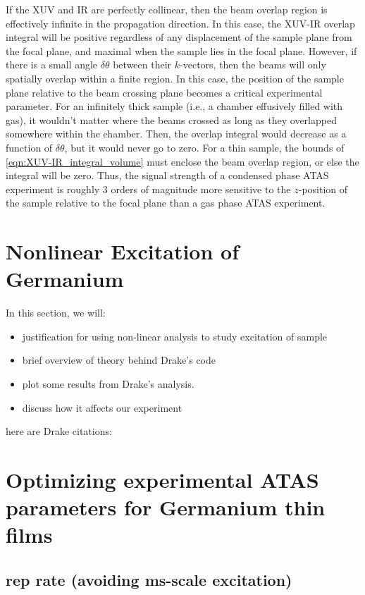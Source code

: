 If the XUV and IR are perfectly collinear, then the beam overlap region is effectively infinite in the propagation direction. In this case, the XUV-IR overlap integral will be positive regardless of any displacement of the sample plane from the focal plane, and maximal when the sample lies in the focal plane. However, if there is a small angle $\delta \theta$ between their $k$-vectors, then the beams will only spatially overlap within a finite region. In this case, the position of the sample plane relative to the beam crossing plane becomes a critical experimental parameter. For an infinitely thick sample (i.e., a chamber effusively filled with gas), it wouldn't matter where the beams crossed as long as they overlapped somewhere within the chamber. Then, the overlap integral would decrease as a function of $\delta \theta$, but it would never go to zero. For a thin sample, the bounds of \cref{eqn:XUV-IR_integral_volume} must enclose the beam overlap region, or else the integral will be zero. Thus, the signal strength of a condensed phase ATAS experiment is roughly 3 orders of magnitude more sensitive to the $z$-position of the sample relative to the focal plane than a gas phase ATAS experiment.


\section{Nonlinear Excitation of Germanium}

In this section, we will:
\begin{itemize}
\item justification for using non-linear analysis to study excitation of sample
\item brief overview of theory behind Drake's code
\item plot some results from Drake's analysis.
\item discuss how it affects our experiment
\end{itemize}

here are Drake citations: \cite{austinSemiconductorSurfaceModification2017,wernerSingleShotMultiStageDamage2019,sergaevaUltrafastExcitationConductionband2018,austinFemtosecondLaserDamage2018}

\section{Optimizing experimental ATAS parameters for Germanium thin films}

\subsection{rep rate (avoiding ms-scale excitation)}

